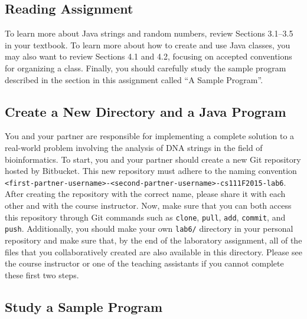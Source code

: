 \vspace{-0.15in}
\subsection*{Reading Assignment}
\vspace{-0.05in}

To learn more about Java strings and random numbers, review Sections 3.1--3.5 in your textbook. To learn more about how
to create and use Java classes, you may also want to review Sections 4.1 and 4.2, focusing on accepted conventions for
organizing a class. Finally, you should carefully study the sample program described in the section in this assignment
called ``{A Sample Program}''.

\vspace{-0.05in}
\subsection*{Create a New Directory and a Java Program}
\vspace{-0.05in}

You and your partner are responsible for implementing a complete solution to a real-world problem involving the analysis
of DNA strings in the field of bioinformatics. To start, you and your partner should create a new Git repository hosted
by Bitbucket. This new repository must adhere to the naming convention {\tt
<first-partner-username>-<second-partner-username>-cs111F2015-lab6}. After creating the repository with the correct
name, please share it with each other and with the course instructor. Now, make sure that you can both access this
repository through Git commands such as {\tt clone}, {\tt pull}, {\tt add}, {\tt commit}, and {\tt push}. Additionally,
you should make your own {\tt lab6/} directory in your personal repository and make sure that, by the end of the
laboratory assignment, all of the files that you collaboratively created are also available in this directory. Please
see the course instructor or one of the teaching assistants if you cannot complete these first two steps.


\vspace{-0.05in}
\subsection*{Study a Sample Program}
\vspace{-0.05in}

